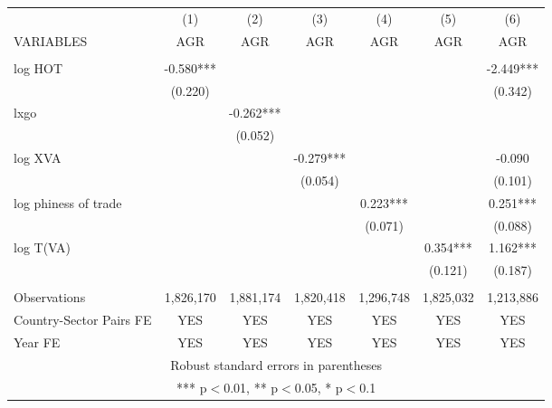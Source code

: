 \documentclass[]{article}
\begin{document}
\begin{tabular}{lcccccc} \hline
 & (1) & (2) & (3) & (4) & (5) & (6) \\
VARIABLES & AGR & AGR & AGR & AGR & AGR & AGR \\ \hline
 &  &  &  &  &  &  \\
log HOT & -0.580*** &  &  &  &  & -2.449*** \\
 & (0.220) &  &  &  &  & (0.342) \\
lxgo &  & -0.262*** &  &  &  &  \\
 &  & (0.052) &  &  &  &  \\
log XVA &  &  & -0.279*** &  &  & -0.090 \\
 &  &  & (0.054) &  &  & (0.101) \\
log phiness of trade &  &  &  & 0.223*** &  & 0.251*** \\
 &  &  &  & (0.071) &  & (0.088) \\
log T(VA) &  &  &  &  & 0.354*** & 1.162*** \\
 &  &  &  &  & (0.121) & (0.187) \\
 &  &  &  &  &  &  \\
Observations & 1,826,170 & 1,881,174 & 1,820,418 & 1,296,748 & 1,825,032 & 1,213,886 \\
Country-Sector Pairs FE & YES & YES & YES & YES & YES & YES \\
 Year FE & YES & YES & YES & YES & YES & YES \\ \hline
\multicolumn{7}{c}{ Robust standard errors in parentheses} \\
\multicolumn{7}{c}{ *** p$<$0.01, ** p$<$0.05, * p$<$0.1} \\
\end{tabular}
\end{document}
